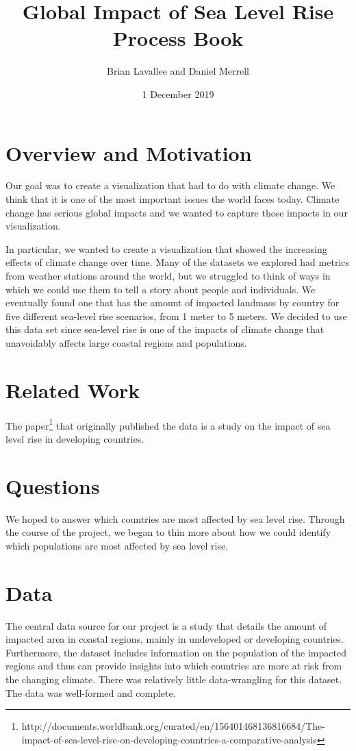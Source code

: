 \documentclass[12pt]{article}
\title{Global Impact of Sea Level Rise Process Book}
\author{Brian Lavallee and Daniel Merrell}
\date{1 December 2019}
\begin{document}
	\maketitle

	\section{Overview and Motivation}
		Our goal was to create a visualization that had to do with climate change.
		We think that it is one of the most important issues the world faces today.
		Climate change has serious global impacts and we wanted to capture those impacts in our visualization.

		In particular, we wanted to create a visualization that showed the increasing effects of climate change over time.
		Many of the datasets we explored had metrics from weather stations around the world, but we struggled to think of ways in which we could use them to tell a story about people and individuals.
		We eventually found one that has the amount of impacted landmass by country for five different sea-level rise scenarios, from 1 meter to 5 meters.
		We decided to use this data set since sea-level rise is one of the impacts of climate change that unavoidably affects large coastal regions and populations.

	\section{Related Work}
		The paper\footnote{http://documents.worldbank.org/curated/en/156401468136816684/The-impact-of-sea-level-rise-on-developing-countries-a-comparative-analysis} that originally published the data is a study on the impact of sea level rise in developing countries.

	\section{Questions}
		We hoped to answer which countries are most affected by sea level rise.
		Through the course of the project, we began to thin more about how we could identify which populations are most affected by sea level rise.

	\section{Data}
		The central data source for our project is a study that details the amount of impacted area in coastal regions, mainly in undeveloped or developing countries.
		Furthermore, the dataset includes information on the population of the impacted regions and thus can provide insights into which countries are more at risk from the changing climate.
		There was relatively little data-wrangling for this dataset. The data was well-formed and complete.
\end{document}

